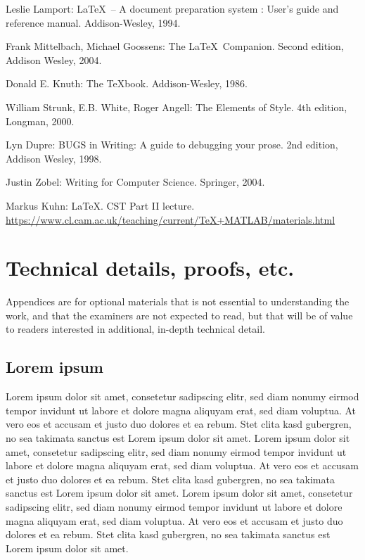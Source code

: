 \documentclass[12pt,a4paper,twoside]{report}
\begin{document}
\begin{thebibliography}{6} %

Leslie Lamport: \LaTeX\ -- A document preparation
system : User's guide and reference manual. Addison-Wesley, 1994.

 Frank Mittelbach, Michael Goossens: The \LaTeX\
Companion. Second edition, Addison Wesley, 2004.

 Donald E. Knuth: The \TeX book. Ad\-dison-Wesley,
  1986.

 William Strunk, E.B. White, Roger Angell: The Elements
of Style. 4th edition, Longman, 2000.

 Lyn Dupre: BUGS in Writing: A guide to debugging your
prose. 2nd edition, Addison Wesley, 1998.

 Justin Zobel: Writing for Computer Science. Springer,
2004.

 Markus Kuhn: \LaTeX. CST Part II lecture.\\
\url{https://www.cl.cam.ac.uk/teaching/current/TeX+MATLAB/materials.html}

\end{thebibliography}

\appendix

\chapter{Technical details, proofs, etc.}

Appendices are for optional materials that is not essential to
understanding the work, and that the examiners are not expected to
read, but that will be of value to readers interested in additional,
in-depth technical detail.

\section{Lorem ipsum}

Lorem ipsum dolor sit amet, consetetur sadipscing elitr, sed diam
nonumy eirmod tempor invidunt ut labore et dolore magna aliquyam erat,
sed diam voluptua. At vero eos et accusam et justo duo dolores et ea
rebum. Stet clita kasd gubergren, no sea takimata sanctus est Lorem
ipsum dolor sit amet. Lorem ipsum dolor sit amet, consetetur
sadipscing elitr, sed diam nonumy eirmod tempor invidunt ut labore et
dolore magna aliquyam erat, sed diam voluptua. At vero eos et accusam
et justo duo dolores et ea rebum. Stet clita kasd gubergren, no sea
takimata sanctus est Lorem ipsum dolor sit amet. Lorem ipsum dolor sit
amet, consetetur sadipscing elitr, sed diam nonumy eirmod tempor
invidunt ut labore et dolore magna aliquyam erat, sed diam voluptua.
At vero eos et accusam et justo duo dolores et ea rebum. Stet clita
kasd gubergren, no sea takimata sanctus est Lorem ipsum dolor sit
amet.
\end{document}
